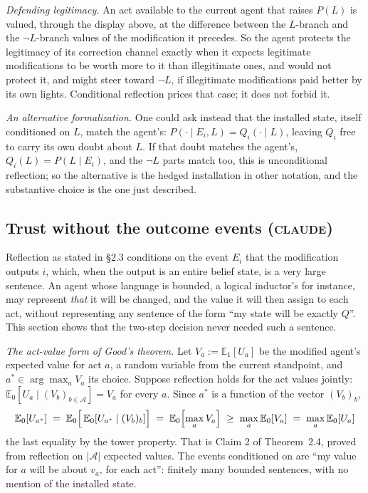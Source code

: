 \documentclass[11pt,a4paper]{article}
\newcommand{\CLAUDE}{\textnormal{\scshape claude}}
\begin{document}
\emph{Defending legitimacy.} An act available to the current agent that raises $P(L)$ is valued, through the display above, at the difference between the $L$-branch and the $\neg L$-branch values of the modification it precedes. So the agent protects the legitimacy of its correction channel exactly when it expects legitimate modifications to be worth more to it than illegitimate ones, and would not protect it, and might steer toward $\neg L$, if illegitimate modifications paid better by its own lights. Conditional reflection prices that case; it does not forbid it.

\emph{An alternative formalization.} One could ask instead that the installed state, itself conditioned on $L$, match the agent's: $P(\cdot \mid E_i, L) = Q_i(\cdot \mid L)$, leaving $Q_i$ free to carry its own doubt about $L$. If that doubt matches the agent's, $Q_i(L) = P(L \mid E_i)$, and the $\neg L$ parts match too, this is unconditional reflection; so the alternative is the hedged installation in other notation, and the substantive choice is the one just described.

\subsection{Trust without the outcome events (\CLAUDE)}
Reflection as stated in \S2.3 conditions on the event $E_i$ that the modification outputs $i$, which, when the output is an entire belief state, is a very large sentence. An agent whose language is bounded, a logical inductor's for instance, may represent \emph{that} it will be changed, and the value it will then assign to each act, without representing any sentence of the form ``my state will be exactly $Q$''. This section shows that the two-step decision never needed such a sentence.

\emph{The act-value form of Good's theorem.} Let $V_a := \mathbb E_1[ U_a]$ be the modified agent's expected value for act $a$, a random variable from the current standpoint, and $a^* \in \arg\max_a V_a$ its choice. Suppose reflection holds for the act values jointly: $\mathbb E_0[ U_a \mid (V_b)_{b \in \mathcal A}] = V_a$ for every $a$. Since $a^*$ is a function of the vector $(V_b)_b$,
\[
\mathbb E_0[ U_{a^*}] \;=\; \mathbb E_0\Bigl[\, \mathbb E_0[ U_{a^*} \mid (V_b)_b] \Bigr] \;=\; \mathbb E_0\Bigl[ \max_a V_a \Bigr] \;\ge\; \max_a \mathbb E_0[ V_a] \;=\; \max_a \mathbb E_0[ U_a]
\]
the last equality by the tower property. That is Claim 2 of Theorem~2.4, proved from reflection on $|\mathcal A|$ expected values. The events conditioned on are ``my value for $a$ will be about $v_a$, for each act'': finitely many bounded sentences, with no mention of the installed state.
\end{document}
